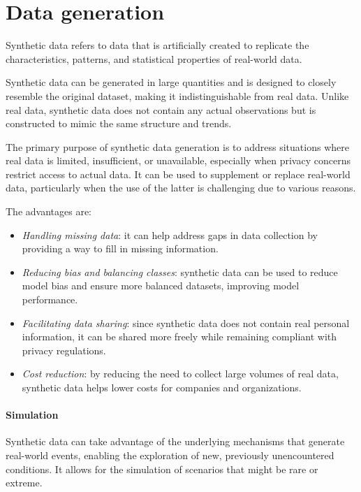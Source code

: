 \section{Data generation}

\begin{definition}
    Synthetic data refers to data that is artificially created to replicate the characteristics, patterns, and statistical properties of real-world data.
\end{definition}
\noindent Synthetic data can be generated in large quantities and is designed to closely resemble the original dataset, making it indistinguishable from real data. Unlike real data, synthetic data does not contain any actual observations but is constructed to mimic the same structure and trends.

The primary purpose of synthetic data generation is to address situations where real data is limited, insufficient, or unavailable, especially when privacy concerns restrict access to actual data. 
It can be used to supplement or replace real-world data, particularly when the use of the latter is challenging due to various reasons.

\noindent The advantages are: 
\begin{itemize}
    \item \textit{Handling missing data}: it can help address gaps in data collection by providing a way to fill in missing information.
    \item \textit{Reducing bias and balancing classes}: synthetic data can be used to reduce model bias and ensure more balanced datasets, improving model performance.
    \item \textit{Facilitating data sharing}: since synthetic data does not contain real personal information, it can be shared more freely while remaining compliant with privacy regulations.
    \item \textit{Cost reduction}: by reducing the need to collect large volumes of real data, synthetic data helps lower costs for companies and organizations.
\end{itemize}

\paragraph*{Simulation}
Synthetic data can take advantage of the underlying mechanisms that generate real-world events, enabling the exploration of new, previously unencountered conditions. 
It allows for the simulation of scenarios that might be rare or extreme.

